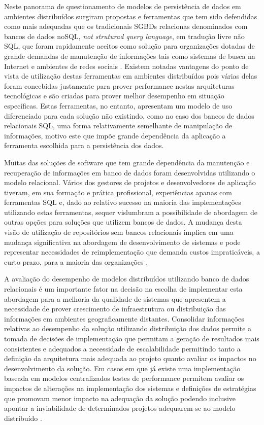 \documentclass[12pt, a4paper]{article}
\begin{document}
Neste panorama de questionamento de modelos de persistência de dados em ambientes distribuídos surgiram 
propostas e ferramentas que tem sido defendidas como mais adequadas que os tradicionais SGBDs relacionas
denominados com bancos de dados noSQL, \textit{not struturad query language}, em tradução livre não SQL, que foram
rapidamente aceitos como solução para organizações dotadas de grande demandas de manutenção de informações
tais como sistemas de busca na Internet e ambientes de redes sociais \cite{cattell2011scalable}. Existem notadas vantagens do ponto
de vista de utilização destas ferramentas em ambientes distribuídos pois várias delas foram concebidas
justamente para prover performance nestas arquiteturas tecnológicas e são criadas para prover melhor
desempenho em situação específicas. Estas ferramentas, no entanto, apresentam um modelo de uso diferenciado
para cada solução não existindo, como no caso dos bancos de dados relacionais SQL, uma forma relativamente
semelhante de manipulação de informações, motivo este que impõe grande dependência da aplicação a
ferramenta escolhida para a persistência dos dados.

Muitas das soluções de software que tem grande dependência da manutenção e recuperação de informações
em banco de dados foram desenvolvidas utilizando o modelo relacional. Vários dos gestores de projetos 
e desenvolvedores de aplicação tiveram, em sua formação e prática profissional, experiências apanas
com ferramentas SQL e, dado ao relativo sucesso na maioria das implementações utilizando estas ferramentas,
sequer vislumbram a possibilidade de abordagem de outras opções para soluções que utilizem 
bancos de dados. A mudança desta visão de utilização de repositórios sem bancos relacionais
implica em uma mudança significativa na abordagem de desenvolvimento de sistemas e pode representar
necessidades de reimplementação que demanda custos impraticáveis, a curto prazo, para a maioria das
organizações \cite{Tran_KLF_11}.

A avaliação do desempenho de modelos distribuídos utilizando banco de dados relacionais é um importante
fator na decisão na escolha de implementar esta abordagem para a melhoria da qualidade de sistemas
que apresentem a necessidade de prover crescimento de infraestrutura ou distribuição das informações 
em ambientes geograficamente distantes. Consolidar informações relativas ao desempenho da solução 
utilizando distribuição dos dados permite a tomada de decisões de implementação que permitam a 
geração de resultados mais consistentes e adequados a necessidade de escalabilidade permitindo tanto
a definição da arquitetura mais adequada ao projeto quanto avaliar os impactos no desenvolvimento
da solução. Em casos em que já existe uma implementação baseada em modelos centralizados testes de 
performance permitem avaliar os impactos de alterações na implementação dos sistemas e definições
de estratégias que promovam menor impacto na adequação da solução podendo inclusive apontar a inviabilidade
de determinados projetos adequarem-se ao modelo distribuído \cite{lin2011tenzing}.
\end{document}
